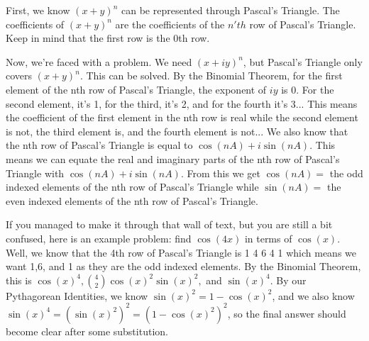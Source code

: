 \documentclass{article}
\begin{document}
\vspace{5mm}
\noindent First, we know $(x+y)^n$ can be represented through Pascal's Triangle. The coefficients of $(x+y)^n$ are the coefficients of the $n'th$ row of Pascal's Triangle. Keep in mind that the first row is the 0th row. 

\vspace{5mm}
\noindent Now, we're faced with a problem. We need $(x+iy)^n$, but Pascal's Triangle only covers $(x+y)^n$. This can be solved. By the Binomial Theorem, for the first element of the nth row of Pascal's Triangle, the exponent of $iy$ is 0. For the second element, it's 1, for the third, it's 2, and for the fourth it's 3... This means the coefficient of the first element in the nth row is real while the second element is not, the third element is, and the fourth element is not... We also know that the nth row of Pascal's Triangle is equal to $\cos(nA)+i\sin(nA)$. This means we can equate the real and imaginary parts of the nth row of Pascal's Triangle with $\cos(nA)+i\sin(nA)$. From this we get $\cos(nA) = $ the odd indexed elements of the nth row of Pascal's Triangle while $\sin(nA) = $ the even indexed elements of the nth row of Pascal's Triangle.

\vspace{5mm}
\noindent If you managed to make it through that wall of text, but you are still a bit confused, here is an example problem: find $\cos(4x)$ in terms of $\cos(x)$. Well, we know that the 4th row of Pascal's Triangle is 1 4 6 4 1 which means we want 1,6, and 1 as they are the odd indexed elements. By the Binomial Theorem, this is $\cos(x)^4, {4\choose2} \cos(x)^2\sin(x)^2,$ and $\sin(x)^4$. By our Pythagorean Identities, we know $\sin(x)^2 = 1-\cos(x)^2$, and we also know $\sin(x)^4=(\sin(x)^2)^2=(1-\cos(x)^2)^2$, so the final answer should become clear after some substitution.

\vspace{5mm}
\end{document}
